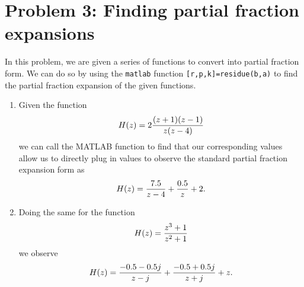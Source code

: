 \documentclass[11pt]{article}
\begin{document}
\section{Problem 3: Finding partial fraction expansions}
In this problem, we are given a series of functions to convert into partial fraction form. 
We can do so by using the \texttt{matlab} function \texttt{[r,p,k]=residue(b,a)} 
to find the partial fraction expansion of the given functions.
\begin{enumerate}[label=\textbf{\alph*)}, leftmargin=2.6em]
    \item Given the function
    \begin{equation} \notag
        H(z) = 2\frac{(z+1)(z-1)}{z(z-4)}
    \end{equation}
    we can call the MATLAB function to find that our corresponding values allow us to 
    directly plug in values to observe the standard partial fraction expansion form as
    \begin{equation} \notag
        H(z) = \frac{7.5}{z-4} + \frac{0.5}{z} + 2.
    \end{equation}

    \item Doing the same for the function
    \begin{equation} \notag
        H(z) = \frac{z^3+1}{z^2+1}
    \end{equation}
    we observe
    \begin{equation} \notag
        H(z) = \frac{-0.5-0.5j}{z-j} + \frac{-0.5+0.5j}{z+j} + z.
    \end{equation}
\end{enumerate}
\end{document}
